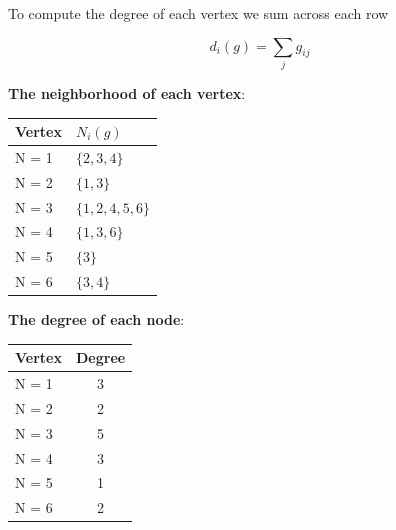 \documentclass[a4paper]{article}
\begin{document}
\noindent To compute the degree of each vertex we sum across each row  

\begin{equation}
	d_i(g) = \sum_{j} g_{ij}
\end{equation}

\noindent \textbf{{\color{blue} The neighborhood of each vertex}}: 

\begin{table}[ht!]
	\centering
	 \label{tab:title} 
	\begin{tabular}{l@{\hskip 0.5in}l}
		Vertex & $N_i(g)$\\
		\hline\hline
		
		N = 1 &  $\big\{ 2, 3, 4 \big\}$ \\
		N = 2 & $\big\{  1, 3 \big\}$ \\
		N = 3 & $\big\{  1, 2, 4, 5, 6 \big\}$ \\
		N = 4 & $\big\{ 1, 3, 6 \big\}$ \\
		N = 5 & $\big\{  3 \big\}$ \\
		N = 6 & $\big\{  3, 4 \big\}$ \\
		
		\bottomrule[1pt]
	\end{tabular}
\end{table}



\noindent \textbf{{\color{blue} The degree of each node}}: 

\begin{table}[ht!]
	\centering
	 \label{tab:title} 
	\begin{tabular}{l@{\hskip 0.5in}c}
		Vertex & Degree\\
		\hline\hline

		N = 1 & 3 \\
		N = 2 & 2 \\
		N = 3 & 5 \\
		N = 4 & 3\\
		N = 5 & 1 \\
		N = 6 & 2 \\
		
		\bottomrule[1pt]
	\end{tabular}
\end{table}
\end{document}
